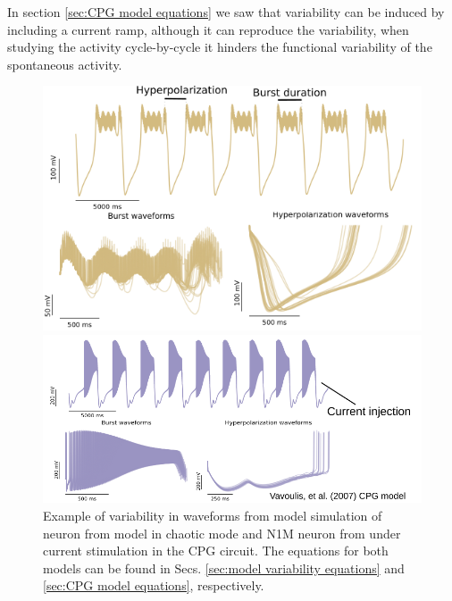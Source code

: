 In section \ref{sec:CPG model equations} we saw that variability can be induced by including a current ramp, although it can reproduce the variability, when studying the activity cycle-by-cycle it hinders the functional variability of the spontaneous activity. 


\begin{figure}[hbt]
	\centering
	\begin{minipage}{0.48\textwidth}
		\includegraphics[width=\textwidth]{img/invariants/variability/TN-burst_variability.png}
	\end{minipage}
	\begin{minipage}{0.48\textwidth}
		\includegraphics[width=\textwidth]{img/invariants/variability/n1m_vav_burst_variability.png}
	\end{minipage}
	\caption{Example of variability in waveforms from model simulation of neuron from \cite{nowotny_probing_2008} model in chaotic mode and N1M neuron from \cite{vavoulis_dynamic_2007} under current stimulation in the CPG circuit. The equations for both models can be found in Secs. \ref{sec:model variability equations} and \ref{sec:CPG model equations}, respectively.}
	\label{fig:model burst variability}
\end{figure}


